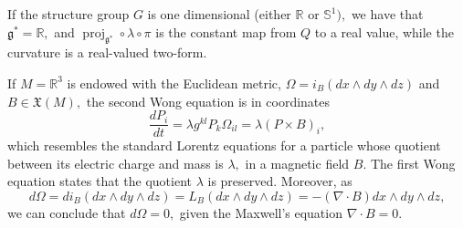 \documentclass[12pt, letterpaper, reqno]{amsart}
\theoremstyle{definition}
\theoremstyle{plain}
\theoremstyle{remark}
\begin{document}
If the structure group $ G $ is one dimensional (either $ \mathbb{R} $ or $ \mathbb{S}^1), $ we have that $ \mathfrak{g}^*= \mathbb{R}, $ and $ \operatorname{proj}_{ \mathfrak{g}^*} \circ\lambda\circ\pi $ is the constant map from $ Q $ to a real value, while the curvature is a real-valued two-form.

If $ M = \mathbb{R}^3$ is endowed with the Euclidean metric, $ \Omega = i_B(dx\wedge dy\wedge dz) $ and $ B\in \mathfrak{X}(M), $ the second Wong equation is in coordinates 
$$ \frac{d P_i}{dt} = \lambda g^{kl} P_k \Omega_{il} = \lambda (P\times B)_i, $$ 
which resembles the standard Lorentz equations for a particle whose quotient between its electric charge and mass is $ \lambda, $ in a magnetic field $ B. $ The first Wong equation states that the quotient $\lambda$ is preserved. Moreover, as
\begin{dmath*}
	d\Omega = di_B(dx\wedge dy\wedge dz) = L_B(dx\wedge dy\wedge dz) = -(\nabla\cdot B) dx\wedge dy\wedge dz,	
\end{dmath*}
we can conclude that $ d\Omega=0, $ given the Maxwell's equation $ \nabla\cdot B=0. $ 
\newpage

\nocite{*}

\end{document}
